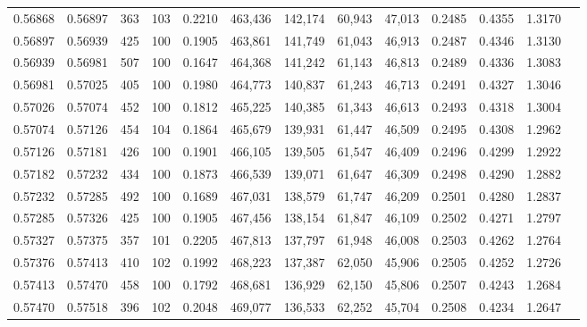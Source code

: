 \begin{tabular}{rrrrrrrrrrrrr}
0.56868 & 0.56897 &   363 & 103 &                                     0.2210 & 463,436 & 142,174 &  60,943 &  47,013 & 0.2485 & 0.4355 & 1.3170 \\
0.56897 & 0.56939 &   425 & 100 &                                     0.1905 & 463,861 & 141,749 &  61,043 &  46,913 & 0.2487 & 0.4346 & 1.3130 \\
0.56939 & 0.56981 &   507 & 100 &                                     0.1647 & 464,368 & 141,242 &  61,143 &  46,813 & 0.2489 & 0.4336 & 1.3083 \\
0.56981 & 0.57025 &   405 & 100 &                                     0.1980 & 464,773 & 140,837 &  61,243 &  46,713 & 0.2491 & 0.4327 & 1.3046 \\
0.57026 & 0.57074 &   452 & 100 &                                     0.1812 & 465,225 & 140,385 &  61,343 &  46,613 & 0.2493 & 0.4318 & 1.3004 \\
0.57074 & 0.57126 &   454 & 104 &                                     0.1864 & 465,679 & 139,931 &  61,447 &  46,509 & 0.2495 & 0.4308 & 1.2962 \\
0.57126 & 0.57181 &   426 & 100 &                                     0.1901 & 466,105 & 139,505 &  61,547 &  46,409 & 0.2496 & 0.4299 & 1.2922 \\
0.57182 & 0.57232 &   434 & 100 &                                     0.1873 & 466,539 & 139,071 &  61,647 &  46,309 & 0.2498 & 0.4290 & 1.2882 \\
0.57232 & 0.57285 &   492 & 100 &                                     0.1689 & 467,031 & 138,579 &  61,747 &  46,209 & 0.2501 & 0.4280 & 1.2837 \\
0.57285 & 0.57326 &   425 & 100 &                                     0.1905 & 467,456 & 138,154 &  61,847 &  46,109 & 0.2502 & 0.4271 & 1.2797 \\
0.57327 & 0.57375 &   357 & 101 &                                     0.2205 & 467,813 & 137,797 &  61,948 &  46,008 & 0.2503 & 0.4262 & 1.2764 \\
0.57376 & 0.57413 &   410 & 102 &                                     0.1992 & 468,223 & 137,387 &  62,050 &  45,906 & 0.2505 & 0.4252 & 1.2726 \\
0.57413 & 0.57470 &   458 & 100 &                                     0.1792 & 468,681 & 136,929 &  62,150 &  45,806 & 0.2507 & 0.4243 & 1.2684 \\
0.57470 & 0.57518 &   396 & 102 &                                     0.2048 & 469,077 & 136,533 &  62,252 &  45,704 & 0.2508 & 0.4234 & 1.2647 \\

\end{tabular}
